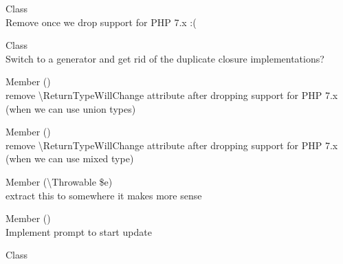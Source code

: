 \begin{DoxyRefList}
\item[Class \doxylink{class_psy_1_1_execution_loop_1_1_runkit_reloader}{Psy\textbackslash{}Execution\+Loop\textbackslash{}Runkit\+Reloader} ]\hfill \\
\label{todo__todo000015}%
%
Remove  once we drop support for PHP 7.\+x \+:(  
\item[Class \doxylink{class_psy_1_1_execution_loop_closure}{Psy\textbackslash{}Execution\+Loop\+Closure} ]\hfill \\
\label{todo__todo000016}%
%
Switch  to a generator and get rid of the duplicate closure implementations?  
\item[Member \doxylink{class_psy_1_1_reflection_1_1_reflection_language_construct_a93608e96fc485fa5bdc54049c9b40199}{Psy\textbackslash{}Reflection\textbackslash{}Reflection\+Language\+Construct\+::get\+File\+Name} ()]\hfill \\
\label{todo__todo000018}%
%
remove \textbackslash{}\+Return\+Type\+Will\+Change attribute after dropping support for PHP 7.\+x (when we can use union types) 
\item[Member \doxylink{class_psy_1_1_reflection_1_1_reflection_language_construct_parameter_a18c00f7e5595ba84404bdecbb340a7f1}{Psy\textbackslash{}Reflection\textbackslash{}Reflection\+Language\+Construct\+Parameter\+::get\+Default\+Value} ()]\hfill \\
\label{todo__todo000019}%
%
remove \textbackslash{}\+Return\+Type\+Will\+Change attribute after dropping support for PHP 7.\+x (when we can use mixed type) 
\item[Member \doxylink{class_psy_1_1_shell_a4e0f8b638e0b040b12181fe52f249eb6}{Psy\textbackslash{}Shell\+::format\+Exception} (\textbackslash{}Throwable \$e)]\hfill \\
\label{todo__todo000020}%
%
extract this to somewhere it makes more sense 
\item[Member \doxylink{class_psy_1_1_shell_a31ff80a0cccc18dc5a290a6a9b8ef7f4}{Psy\textbackslash{}Shell\+::write\+Version\+Info} ()]\hfill \\
\label{todo__todo000021}%
%
Implement prompt to start update 
\item[Class \doxylink{class_psy_1_1_sudo_1_1_sudo_visitor}{Psy\textbackslash{}Sudo\textbackslash{}Sudo\+Visitor} ]\hfill \\

\end{DoxyRefList}
